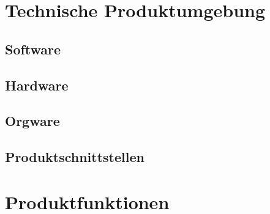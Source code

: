 \documentclass[12pt, a4paper]{article}
\begin{document}
\section{Technische Produktumgebung}
\subsection{Software}
\subsection{Hardware}
\subsection{Orgware}
\subsection{Produktschnittstellen}
\pagebreak

\section{Produktfunktionen}
\end{document}
